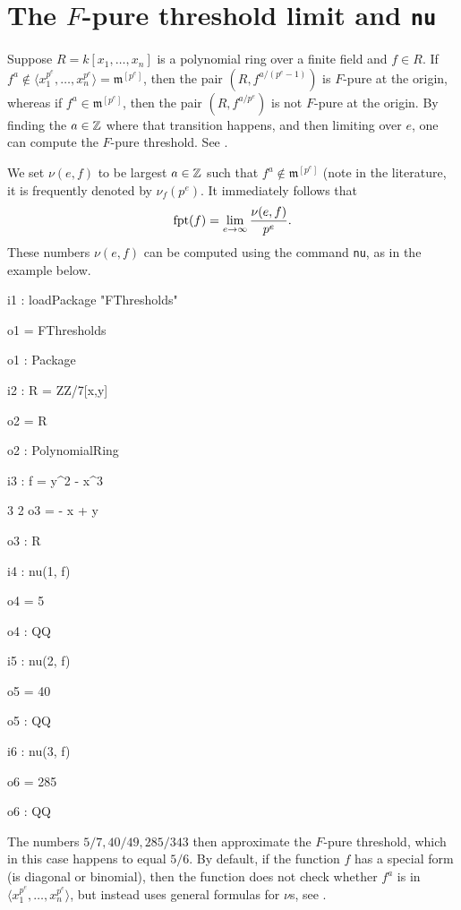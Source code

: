 \documentclass{amsart}
\newcommand{\fram}{\mathfrak{m}}
\begin{document}
\section{The $F$-pure threshold limit and {\tt nu}}
\label{sec.Nu}

Suppose $R = k[x_1, \dots, x_n]$ is a polynomial ring over a finite field and $f \in R$.    If $f^a \notin \langle x_1^{p^e}, \dots, x_n^{p^e} \rangle = \fram^{[p^e]}$, then the pair $(R, f^{a/(p^e -1)})$ is $F$-pure at the origin, whereas if $f^a \in \fram^{[p^e]}$, then the pair $(R, f^{a/p^e})$ is not $F$-pure at the origin.  By finding the $a \in \mathbb{Z}$ where that transition happens, and then limiting over $e$, one can compute the $F$-pure threshold.  See \cite{MustataTakagiWatanabeFThresholdsAndBernsteinSato}.

We set $\nu(e, f)$ to be largest $a \in \mathbb{Z}$ such that $f^a \notin \fram^{[p^e]}$ (note in the literature, it is frequently denoted by $\nu_f(p^e)$.  It immediately follows that 
\[
\operatorname{{fpt}}(f) = \lim_{e \to \infty} {\nu(e, f) \over p^e}.
\]
These numbers $\nu(e, f)$ can be computed using the command {\tt nu}, as in the example below.  
\medskip
{\small
{}
\begin{MyVerbatim}
i1 : loadPackage "FThresholds"

o1 = FThresholds

o1 : Package

i2 : R = ZZ/7[x,y]

o2 = R

o2 : PolynomialRing

i3 : f = y^2 - x^3

        3    2
o3 = - x  + y

o3 : R

i4 : nu(1, f)

o4 = 5

o4 : QQ

i5 : nu(2, f)

o5 = 40

o5 : QQ

i6 : nu(3, f)

o6 = 285

o6 : QQ
\end{MyVerbatim}
}
\medskip
The numbers $5/7, 40/49, 285/343$ then approximate the $F$-pure threshold, which in this case happens to equal $5/6$.  By default, if the function $f$ has a special form (is diagonal or binomial), then the function does not check whether $f^a$ is in  $\langle x_1^{p^e}, \dots, x_n^{p^e} \rangle$, but instead uses general formulas for $\nu$s, see \cite{HernandezFPureThresholdOfBinomial,HernandezFInvariantsOfDiagonalHyp}.
\end{document}
